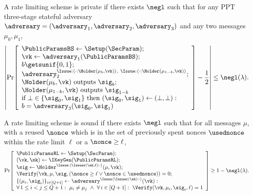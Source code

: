 \begin{definition}[Privacy]\label{def:bs-blindness}
	A rate limiting scheme is private if there exists \(\negl\) such that for any PPT three-stage stateful adversary
	\(\adversary=(\adversary_1,\adversary_2,\adversary_3)\) and any two messages \(\mu_0,\mu_1\),
	\[
	\left|\Pr\!\left[
	\begin{array}{l}
		\PublicParamsBS\gets \Setup(\SecParam);\\
		\vk\gets \adversary_1(\PublicParamsBS);\\ b\getsunif\{0,1\};\\
		\adversary_2^{\Issue:\langle \cdot: \Holder(\mu_b,\vk)\rangle ,~ \Issue:\langle \cdot: \Holder(\mu_{1-b},\vk)\rangle }; \\
		\Holder(\mu_b,\vk) \text{ outputs }\sig_b;\\
		\Holder(\mu_{1-b},\vk) \text{ outputs }\sig_{1-b}\\
		\text{if }\bot\in\{\sig_0,\sig_1\}\text{ then }(\sig_0,\sig_1)\gets(\bot,\bot):\\
		b=\adversary_3(\sig_0,\sig_1)
	\end{array}
	\right]-\frac{1}{2}\right|
	\le \negl(\lambda).
	\]
\end{definition}


\begin{definition}[Soundness]\label{def:rate-limit-soundness}
	A rate limiting scheme is sound if there exists \(\negl\) such that for all messages \(\mu\), with a reused \(\nonce\) which is in the set of previously spent nonces \(\usednonce\) within the rate limit $\ell$ or a \(\nonce \geq \ell\),
 	\[
 	\Pr\!\left[
 	\begin{array}{l}
 		\PublicParamsRL \gets \Setup(\SecParam); \\
 		(\vk,\sk)\gets \IKeyGen(\PublicParamsRL);\\
 		\sig\gets \Holder^{\Issue: \langle \Issuer(\sk,\ell): \cdot  \rangle }(\mu,\vk);\\
    \Verify(\vk,\mu,\sig,(\nonce \geq \ell \lor \nonce \in \usednonce) )=0; \\
      \{(\mu_i,\sig_i)\}_{i\in[Q+1]}\gets \adversary^{\Issue \langle \Issuer(\sk):\cdot \rangle}(\vk):\\
      \forall\,1\le i<j\le Q+1:\ \mu_i\neq \mu_j\ \land\ \forall\,i\in[Q+1]:\ \Verify(\vk,\mu_i,\sig_i,\ell)=1 	\end{array}
 	\right]
 	\ge 1-\negl(\lambda).
 	\]
\end{definition}


